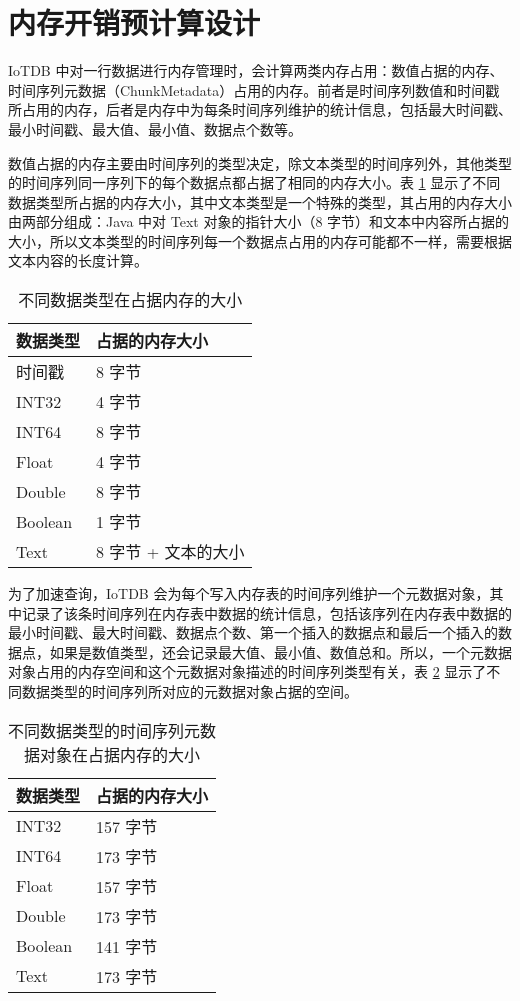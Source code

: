 \section{内存开销预计算设计}
IoTDB 中对一行数据进行内存管理时，会计算两类内存占用：数值占据的内存、时间序列元数据（ChunkMetadata）占用的内存。前者是时间序列数值和时间戳所占用的内存，后者是内存中为每条时间序列维护的统计信息，包括最大时间戳、最小时间戳、最大值、最小值、数据点个数等。

数值占据的内存主要由时间序列的类型决定，除文本类型的时间序列外，其他类型的时间序列同一序列下的每个数据点都占据了相同的内存大小。表 \ref{tab:data-type-mem-size} 显示了不同数据类型所占据的内存大小，其中文本类型是一个特殊的类型，其占用的内存大小由两部分组成：Java 中对 Text 对象的指针大小（8 字节）和文本中内容所占据的大小，所以文本类型的时间序列每一个数据点占用的内存可能都不一样，需要根据文本内容的长度计算。
\begin{table}
  \centering
  \caption{不同数据类型在占据内存的大小}
  \begin{tabular}{ll}
    \toprule
    数据类型 & 占据的内存大小 \\
    \midrule
    时间戳 & 8 字节 \\
    INT32 & 4 字节 \\
    INT64 & 8 字节 \\
    Float & 4 字节 \\
    Double & 8 字节\\
    Boolean & 1 字节 \\
    Text & 8 字节 + 文本的大小 \\
    \bottomrule
  \end{tabular}
  \label{tab:data-type-mem-size}
\end{table}

为了加速查询，IoTDB 会为每个写入内存表的时间序列维护一个元数据对象，其中记录了该条时间序列在内存表中数据的统计信息，包括该序列在内存表中数据的最小时间戳、最大时间戳、数据点个数、第一个插入的数据点和最后一个插入的数据点，如果是数值类型，还会记录最大值、最小值、数值总和。所以，一个元数据对象占用的内存空间和这个元数据对象描述的时间序列类型有关，表 \ref{tab:data-type-statistic-mem-size} 显示了不同数据类型的时间序列所对应的元数据对象占据的空间。

\begin{table}
  \centering
  \caption{不同数据类型的时间序列元数据对象在占据内存的大小}
  \begin{tabular}{ll}
    \toprule
    数据类型 & 占据的内存大小 \\
    \midrule
    INT32 & 157 字节 \\
    INT64 & 173 字节 \\
    Float & 157 字节 \\
    Double & 173 字节\\
    Boolean & 141 字节 \\
    Text & 173 字节 \\
    \bottomrule
  \end{tabular}
  \label{tab:data-type-statistic-mem-size}
\end{table}

